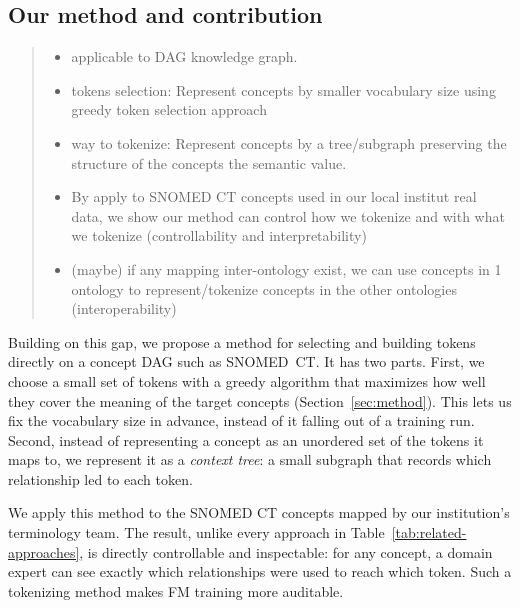 \subsection{Our method and contribution}
\begin{quote}\small\itshape
\begin{itemize}
\item applicable to DAG knowledge graph.
\item tokens selection: Represent concepts by smaller vocabulary size using greedy token selection approach
\item way to tokenize: Represent concepts by a tree/subgraph preserving the structure of the concepts the semantic value.
\item By apply to SNOMED CT concepts used in our local institut real data, we show our method can control how we tokenize and with what we tokenize (controllability and interpretability)
\item (maybe) if any mapping inter-ontology exist, we can use concepts in 1 ontology to represent/tokenize concepts in the other ontologies (interoperability)
\end{itemize}
\end{quote}
Building on this gap, we propose a method for selecting and building tokens directly on a concept DAG such as SNOMED~CT. It has two parts. First, we choose a small set of tokens with a greedy algorithm that maximizes how well they cover the meaning of the target concepts (Section~\ref{sec:method}). This lets us fix the vocabulary size in advance, instead of it falling out of a training run. Second, instead of representing a concept as an unordered set of the tokens it maps to, we represent it as a \emph{context tree}: a small subgraph that records which relationship led to each token.

We apply this method to the SNOMED CT concepts mapped by our institution's terminology team. The result, unlike every approach in Table~\ref{tab:related-approaches}, is directly controllable and inspectable: for any concept, a domain expert can see exactly which relationships were used to reach which token. Such a tokenizing method makes FM training more auditable.
